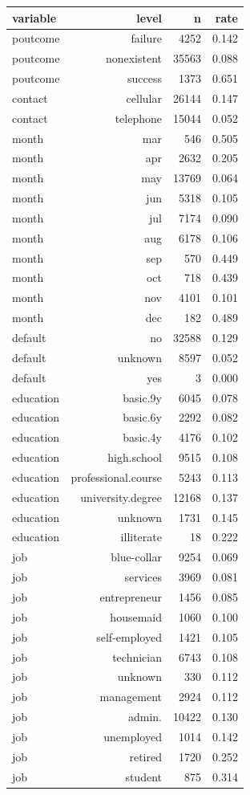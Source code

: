 \begin{tabular}{lrrr}
\toprule
variable & level & n & rate \\
\midrule
poutcome & failure & 4252 & 0.142 \\
poutcome & nonexistent & 35563 & 0.088 \\
poutcome & success & 1373 & 0.651 \\
contact & cellular & 26144 & 0.147 \\
contact & telephone & 15044 & 0.052 \\
month & mar & 546 & 0.505 \\
month & apr & 2632 & 0.205 \\
month & may & 13769 & 0.064 \\
month & jun & 5318 & 0.105 \\
month & jul & 7174 & 0.090 \\
month & aug & 6178 & 0.106 \\
month & sep & 570 & 0.449 \\
month & oct & 718 & 0.439 \\
month & nov & 4101 & 0.101 \\
month & dec & 182 & 0.489 \\
default & no & 32588 & 0.129 \\
default & unknown & 8597 & 0.052 \\
default & yes & 3 & 0.000 \\
education & basic.9y & 6045 & 0.078 \\
education & basic.6y & 2292 & 0.082 \\
education & basic.4y & 4176 & 0.102 \\
education & high.school & 9515 & 0.108 \\
education & professional.course & 5243 & 0.113 \\
education & university.degree & 12168 & 0.137 \\
education & unknown & 1731 & 0.145 \\
education & illiterate & 18 & 0.222 \\
job & blue-collar & 9254 & 0.069 \\
job & services & 3969 & 0.081 \\
job & entrepreneur & 1456 & 0.085 \\
job & housemaid & 1060 & 0.100 \\
job & self-employed & 1421 & 0.105 \\
job & technician & 6743 & 0.108 \\
job & unknown & 330 & 0.112 \\
job & management & 2924 & 0.112 \\
job & admin. & 10422 & 0.130 \\
job & unemployed & 1014 & 0.142 \\
job & retired & 1720 & 0.252 \\
job & student & 875 & 0.314 \\
\bottomrule
\end{tabular}